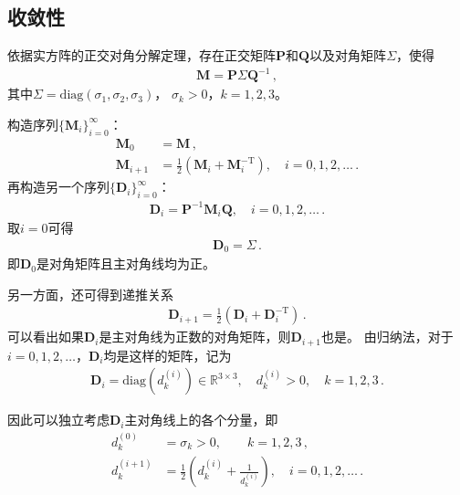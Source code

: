 \subsection{收敛性}\label{sub:收敛性02ex02}
\begin{prove}
    依据实方阵的正交对角分解定理，存在正交矩阵$\bm P$和$\bm Q$以及对角矩阵$\bm \varSigma$，使得
    \begin{align}\label{eq:02ex.04}
        \bm M=\bm P\bm \varSigma\bm Q^{-1}\, ,
    \end{align}
    其中${\bm \varSigma}=\mathrm{diag}(\sigma_1,\sigma_2,\sigma_3)$，
    $\sigma_k>0$，$k=1,2,3$。

    构造序列$\displaystyle\{\bm M_i\}_{i=0}^{\infty}$：
    \begin{align}
        \bm M_0     & =\bm M\, ,                                                           \\
        \bm M_{i+1} & =\frac{1}{2}(\bm M_i+\bm M_i^{-\mathrm{T}}),\quad i=0,1,2,\ldots\, .
    \end{align}
    再构造另一个序列$\displaystyle\{\bm D_i\}_{i=0}^{\infty}$：
    \begin{align}
        \bm D_i=\bm P^{-1}\bm M_i\bm Q,\quad i=0,1,2,\ldots\, .
    \end{align}
    取$i=0$可得
    \begin{align}
        \bm D_0=\bm \varSigma\, .
    \end{align}
    即$\bm D_0$是对角矩阵且主对角线均为正。

    另一方面，还可得到递推关系
    \begin{align}
        \bm D_{i+1}=\frac{1}{2}(\bm D_i+\bm D_i^{-\mathrm{T}})\, .
    \end{align}
    可以看出如果$\bm D_i$是主对角线为正数的对角矩阵，则$\bm D_{i+1}$也是。
    由归纳法，对于$i=0,1,2,\ldots$，$\bm D_i$均是这样的矩阵，记为
    \begin{align}
        \bm D_i=\mathrm{diag}\left(d_k^{(i)}\right)\in\mathbb{R}^{3\times 3}, \quad d_k^{(i)}>0, \quad k=1,2,3\, .
    \end{align}

    因此可以独立考虑$\bm D_i$主对角线上的各个分量，即
    \begin{align}
        d_k^{(0)}   & =\sigma_k>0,\qquad k=1,2,3\, ,                                                                     \\
        d_k^{(i+1)} & = \frac{1}{2}\left(d_k^{(i)}+\frac{1}{d_k^{(i)}}\right),\quad i=0,1,2,\ldots\label{eq:02ex.03}\, .
    \end{align}


\end{prove}
